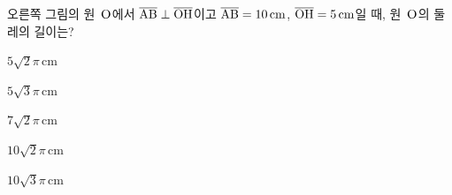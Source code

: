\noindent\begin{minipage}[t]{0.58\linewidth}\vspace{0pt}\raggedright 오른쪽 그림의 원~$\mathrm{O}$에서 $\overline{\mathrm{AB}}\perp\overline{\mathrm{OH}}$이고 $\overline{\mathrm{AB}}=10\,\mathrm{cm}$, $\overline{\mathrm{OH}}=5\,\mathrm{cm}$일 때, 원~$\mathrm{O}$의 둘레의 길이는?\end{minipage}\hfill\begin{minipage}[t]{0.4\linewidth}\vspace{0pt}\centering \resizebox{\ifdim\width>\linewidth\linewidth\else\width\fi}{!}{}\end{minipage}\par
\begin{choicesii}{\rule[-3ex]{0pt}{8ex}$5\sqrt{2}\pi\,\mathrm{cm}$}{\rule[-3ex]{0pt}{8ex}$5\sqrt{3}\pi\,\mathrm{cm}$}{\rule[-3ex]{0pt}{8ex}$7\sqrt{2}\pi\,\mathrm{cm}$}{\rule[-3ex]{0pt}{8ex}$10\sqrt{2}\pi\,\mathrm{cm}$}{\rule[-3ex]{0pt}{8ex}$10\sqrt{3}\pi\,\mathrm{cm}$}\end{choicesii}
